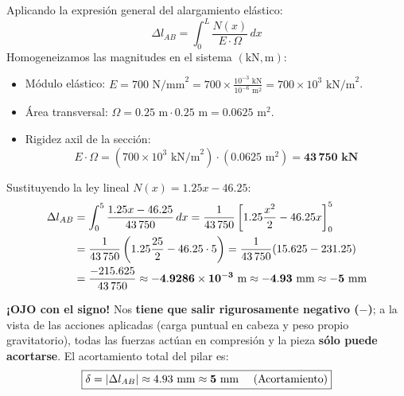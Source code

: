 Aplicando la expresión general del alargamiento elástico:
\begin{equation}
    \Delta l_{AB} = \int_0^L \frac{N(x)}{E \cdot \Omega} \, dx
\end{equation}
Homogeneizamos las magnitudes en el sistema $(\text{kN}, \text{m})$:
\begin{itemize}
    \item Módulo elástico: $E = 700\text{ N/mm}^2 = 700 \times \frac{10^{-3}\text{ kN}}{10^{-6}\text{ m}^2} = 700 \times 10^3\text{ kN/m}^2$.
    \item Área transversal: $\Omega = 0.25\text{ m} \cdot 0.25\text{ m} = 0.0625\text{ m}^2$.
    \item Rigidez axil de la sección:
          \begin{equation}
              E \cdot \Omega = (700 \times 10^3\text{ kN/m}^2) \cdot (0.0625\text{ m}^2) = \mathbf{43\,750\text{ kN}}
          \end{equation}
\end{itemize}
Sustituyendo la ley lineal $N(x) = 1.25 x - 46.25$:
\begin{align}
    \Delta l_{AB} & = \int_0^5 \frac{1.25 x - 46.25}{43\,750} \, dx = \frac{1}{43\,750} \left[ 1.25 \frac{x^2}{2} - 46.25 x \right]_0^5 \notag \\
                  & = \frac{1}{43\,750} \left( 1.25 \frac{25}{2} - 46.25 \cdot 5 \right) = \frac{1}{43\,750} (15.625 - 231.25) \notag \\
                  & = \frac{-215.625}{43\,750} \approx \mathbf{-4.9286 \times 10^{-3}\text{ m}} \approx \mathbf{-4.93\text{ mm}} \approx \mathbf{-5\text{ mm}}
\end{align}

\begin{ImportanteBox}[title={Comprobación Física del Signo Negativo y Magnitud}]
    \textbf{¡OJO con el signo!} Nos \textbf{tiene que salir rigurosamente negativo ($-$)}; a la vista de las acciones aplicadas (carga puntual en cabeza y peso propio gravitatorio), todas las fuerzas actúan en compresión y la pieza \textbf{sólo puede acortarse}. El acortamiento total del pilar es:
    \begin{equation}
        \boxed{\delta = |\Delta l_{AB}| \approx 4.93\text{ mm} \approx \mathbf{5\text{ mm \quad (Acortamiento)}}}
    \end{equation}
\end{ImportanteBox}



